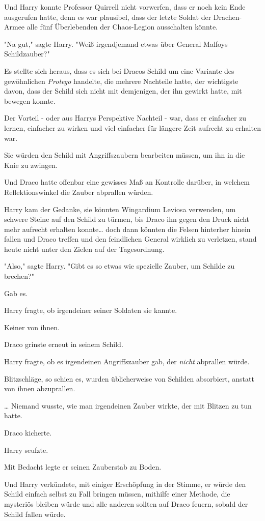 {Und Harry konnte Professor Quirrell nicht vorwerfen, dass er noch kein Ende ausgerufen hatte, denn es war plausibel, dass der letzte Soldat der Drachen-Armee alle fünf Überlebenden der Chaos-Legion ausschalten könnte.

"Na gut," sagte Harry. "Weiß irgendjemand etwas über General Malfoys Schildzauber?"

Es stellte sich heraus, dass es sich bei Dracos Schild um eine Variante des gewöhnlichen \emph{Protego} handelte, die mehrere Nachteile hatte, der wichtigste davon, dass der Schild sich nicht mit demjenigen, der ihn gewirkt hatte, mit bewegen konnte.

Der Vorteil - oder aus Harrys Perspektive Nachteil - war, dass er einfacher zu lernen, einfacher zu wirken und viel einfacher für längere Zeit aufrecht zu erhalten war.

Sie würden den Schild mit Angriffszaubern bearbeiten müssen, um ihn in die Knie zu zwingen.

Und Draco hatte offenbar eine gewisses Maß an Kontrolle darüber, in welchem Reflektionswinkel die Zauber abprallen würden.

Harry kam der Gedanke, sie könnten Wingardium Leviosa verwenden, um schwere Steine auf den Schild zu türmen, bis Draco ihn gegen den Druck nicht mehr aufrecht erhalten konnte… doch dann könnten die Felsen hinterher hinein fallen und Draco treffen und den feindlichen General wirklich zu verletzen, stand heute nicht unter den Zielen auf der Tagesordnung.

"Also," sagte Harry. "Gibt es so etwas wie spezielle Zauber, um Schilde zu brechen?"

Gab es.

Harry fragte, ob irgendeiner seiner Soldaten sie kannte.

Keiner von ihnen.

Draco grinste erneut in seinem Schild.

Harry fragte, ob es irgendeinen Angriffszauber gab, der \emph{nicht} abprallen würde.

Blitzschläge, so schien es, wurden üblicherweise von Schilden absorbiert, anstatt von ihnen abzuprallen.

… Niemand wusste, wie man irgendeinen Zauber wirkte, der mit Blitzen zu tun hatte.

Draco kicherte.

Harry seufzte.

Mit Bedacht legte er seinen Zauberstab zu Boden.

Und Harry verkündete, mit einiger Erschöpfung in der Stimme, er würde den Schild einfach selbst zu Fall bringen müssen, mithilfe einer Methode, die mysteriös bleiben würde und alle anderen sollten auf Draco feuern, sobald der Schild fallen würde.

}
